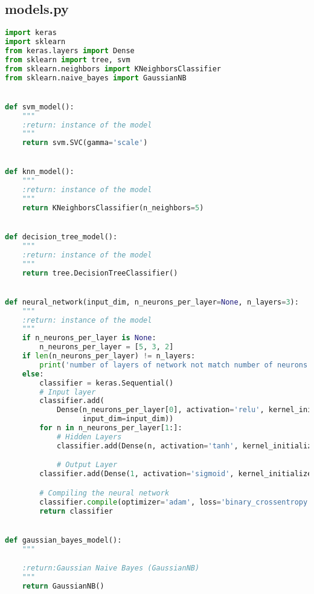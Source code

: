 \documentclass[11pt,a4paper]{article}
\begin{document}
\subsection{models.py}
\begin{lstlisting}[language=Python,basicstyle=\tiny]
import keras
import sklearn
from keras.layers import Dense
from sklearn import tree, svm
from sklearn.neighbors import KNeighborsClassifier
from sklearn.naive_bayes import GaussianNB


def svm_model():
    """
    :return: instance of the model
    """
    return svm.SVC(gamma='scale')


def knn_model():
    """
    :return: instance of the model
    """
    return KNeighborsClassifier(n_neighbors=5)


def decision_tree_model():
    """
    :return: instance of the model
    """
    return tree.DecisionTreeClassifier()


def neural_network(input_dim, n_neurons_per_layer=None, n_layers=3):
    """
    :return: instance of the model
    """
    if n_neurons_per_layer is None:
        n_neurons_per_layer = [5, 3, 2]
    if len(n_neurons_per_layer) != n_layers:
        print('number of layers of network not match number of neurons per layer')
    else:
        classifier = keras.Sequential()
        # Input layer
        classifier.add(
            Dense(n_neurons_per_layer[0], activation='relu', kernel_initializer='random_normal',
                  input_dim=input_dim))
        for n in n_neurons_per_layer[1:]:
            # Hidden Layers
            classifier.add(Dense(n, activation='tanh', kernel_initializer='random_normal'))

            # Output Layer
        classifier.add(Dense(1, activation='sigmoid', kernel_initializer='random_normal'))

        # Compiling the neural network
        classifier.compile(optimizer='adam', loss='binary_crossentropy', metrics=['accuracy'])
        return classifier


def gaussian_bayes_model():
    """

    :return:Gaussian Naive Bayes (GaussianNB)
    """
    return GaussianNB()



\end{lstlisting}
\end{document}
